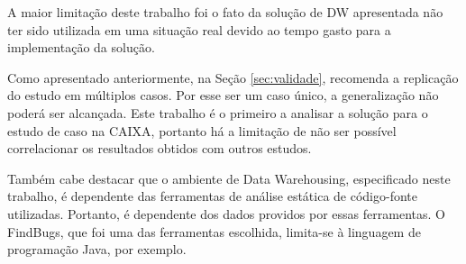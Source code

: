 A maior limitação deste trabalho foi o fato da solução de DW apresentada não ter sido utilizada em uma situação real devido ao tempo gasto para a implementação da solução. 

Como apresentado anteriormente, na Seção \ref{sec:validade},  recomenda a replicação do estudo em múltiplos casos. Por esse ser um caso único, a generalização não poderá ser alcançada. Este trabalho é o primeiro a analisar a solução para o estudo de caso na CAIXA, portanto há a limitação de não ser possível correlacionar os resultados obtidos com outros estudos.

Também cabe destacar que o ambiente de Data Warehousing, especificado neste trabalho, é dependente das ferramentas de análise estática de código-fonte utilizadas. Portanto, é dependente dos dados providos por essas ferramentas. O FindBugs, que foi uma das ferramentas escolhida, limita-se à linguagem de programação Java, por exemplo.




